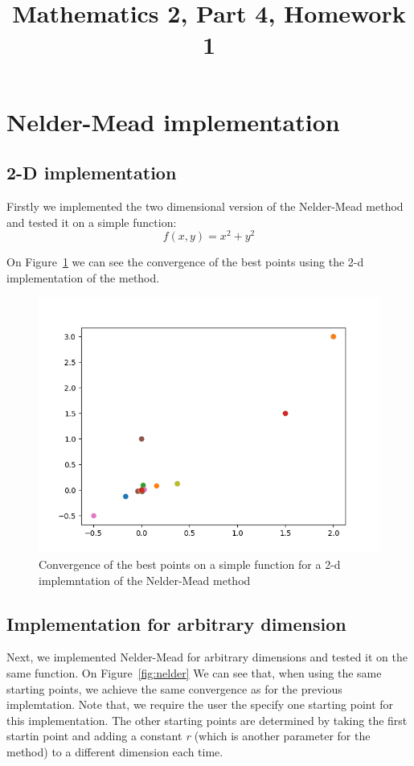 \documentclass[9pt]{IEEEtran}
\title{\vspace{0ex}
Mathematics 2, Part 4, Homework 1}
\begin{document}
\maketitle
\section{Nelder-Mead implementation}
\subsection*{2-D implementation}
Firstly we implemented the two dimensional version of the Nelder-Mead method
 and tested it on a simple function: 
 \[f(x, y) = x^2 + y^2 \]

 On Figure~\ref{fig:nelder_2d} we can see the convergence of the best points using 
 the 2-d implementation of the method. 

\begin{figure}[h]
    \includegraphics[width=\columnwidth]{convergence1.png}
    \caption{Convergence of the best points on a simple function for a 2-d implemntation 
    of the Nelder-Mead method}
    \label{fig:nelder_2d}
\end{figure}

\subsection*{Implementation for arbitrary dimension}
Next, we implemented Nelder-Mead for arbitrary dimensions and tested it on the 
same function. On Figure~\ref{fig:nelder} We can see that, when using the same starting points, we achieve 
the same convergence as for the previous implemtation. Note that, we require the
 user the specify one starting point for this implementation. The other starting 
 points are determined by taking the first startin point and adding a constant \textit{r}
 (which is another parameter for the method) to a different dimension each time. 
\end{document}
